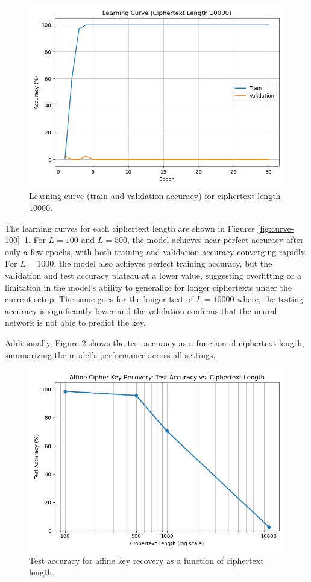 \documentclass[manuscript,screen,acmtog,natbib=false]{acmart}
\begin{document}
  \begin{figure}[h]
      \centering
      \includegraphics[width=0.7\linewidth]{./media/learning_curve_10000.png}
      \caption{Learning curve (train and validation accuracy) for ciphertext length 10000.}
      \label{fig:curve-10000}
  \end{figure}

  The learning curves for each ciphertext length are shown in Figures \ref{fig:curve-100}--\ref{fig:curve-10000}. 
  For $L=100$ and $L=500$, the model achieves near-perfect accuracy after only a few epochs, with both training and validation accuracy 
  converging rapidly. For $L=1000$, the model also achieves perfect training accuracy, but the validation and test accuracy plateau at a
  lower value, suggesting overfitting or a limitation in the model's ability to generalize for longer ciphertexts under the current setup.
  The same goes for the longer text of $L=10000$ where, the testing accuracy is significantly lower and the validation confirms that the neural network
  is not able to predict the key.

  Additionally, Figure \ref{fig:test-acc-vs-length} shows the test accuracy as a function of ciphertext length, summarizing the model's performance across all settings.

  \begin{figure}[h]
      \centering
      \includegraphics[width=0.7\linewidth]{./media/affine_accuracy_vs_length.png}
      \caption{Test accuracy for affine key recovery as a function of ciphertext length.}
      \label{fig:test-acc-vs-length}
  \end{figure}
\end{document}
